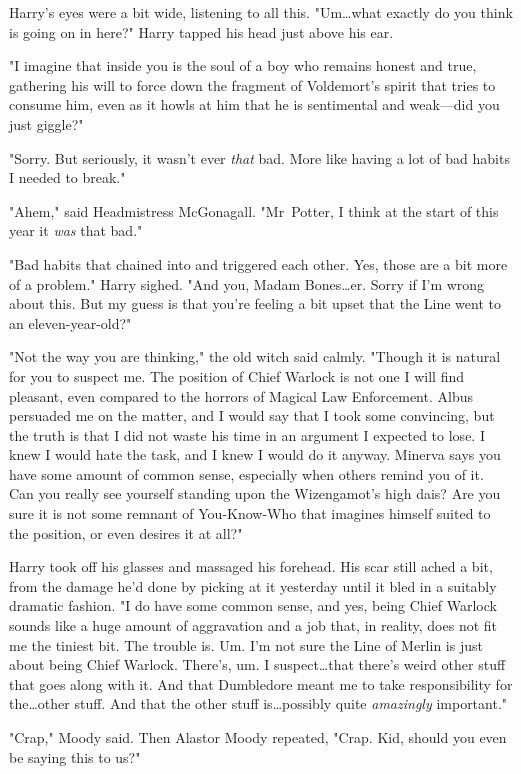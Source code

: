 Harry's eyes were a bit wide, listening to all this. "Um…what exactly
do you think is going on in here?" Harry tapped his head just above his ear.

"I imagine that inside you is the soul of a boy who remains honest and true,
gathering his will to force down the fragment of Voldemort's spirit that tries
to consume him, even as it howls at him that he is sentimental and weak---did
you just giggle?"

"Sorry. But seriously, it wasn't ever \emph{that} bad. More like having a lot
of bad habits I needed to break."

"Ahem," said Headmistress McGonagall. "Mr~Potter, I think at the start of this
year it \emph{was} that bad."

"Bad habits that chained into and triggered each other. Yes, those are a bit
more of a problem." Harry sighed. "And you, Madam Bones…er. Sorry if
I'm wrong about this. But my guess is that you're feeling a bit upset that the
Line went to an eleven-year-old?"

"Not the way you are thinking," the old witch said calmly. "Though it is
natural for you to suspect me. The position of Chief Warlock is not one I will
find pleasant, even compared to the horrors of Magical Law Enforcement. Albus
persuaded me on the matter, and I would say that I took some convincing, but
the truth is that I did not waste his time in an argument I expected to lose. I
knew I would hate the task, and I knew I would do it anyway. Minerva says you
have some amount of common sense, especially when others remind you of it. Can
you really see yourself standing upon the Wizengamot's high dais? Are you sure
it is not some remnant of You-Know-Who that imagines himself suited to the
position, or even desires it at all?"

Harry took off his glasses and massaged his forehead. His scar still ached a
bit, from the damage he'd done by picking at it yesterday until it bled in a
suitably dramatic fashion. "I do have some common sense, and yes, being Chief
Warlock sounds like a huge amount of aggravation and a job that, in reality,
does not fit me the tiniest bit. The trouble is. Um. I'm not sure the Line of
Merlin is just about being Chief Warlock. There's, um. I suspect…that
there's weird other stuff that goes along with it. And that Dumbledore meant me
to take responsibility for the…other stuff. And that the other stuff
is…possibly quite \emph{amazingly} important."

"Crap," Moody said. Then Alastor Moody repeated, "Crap. Kid, should you even be
saying this to us?"

